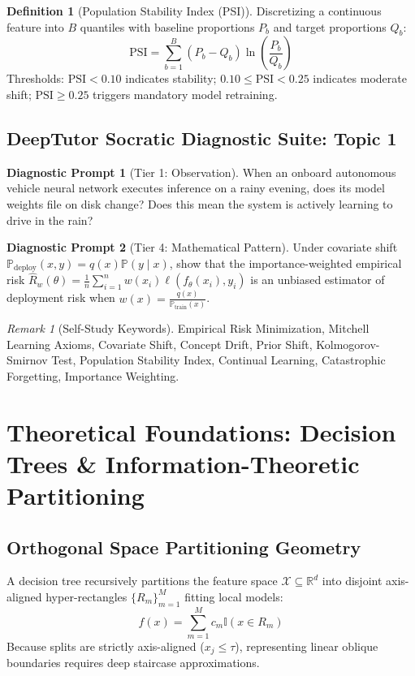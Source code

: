 \documentclass[11pt,a4paper]{article}
\theoremstyle{definition}
\newtheorem{definition}{Definition}[section]
\newtheorem{prompt}{Diagnostic Prompt}[section]
\theoremstyle{plain}
\theoremstyle{remark}
\newtheorem*{remark}{Remark}
\newcommand{\R}{\mathbb{R}}
\begin{document}
\begin{definition}[Population Stability Index (PSI)]
Discretizing a continuous feature into $B$ quantiles with baseline proportions $P_b$ and target proportions $Q_b$:
\begin{equation}
\mathrm{PSI} = \sum_{b=1}^B (P_b - Q_b) \ln\left( \frac{P_b}{Q_b} \right)
\end{equation}
Thresholds: $\mathrm{PSI} < 0.10$ indicates stability; $0.10 \le \mathrm{PSI} < 0.25$ indicates moderate shift; $\mathrm{PSI} \ge 0.25$ triggers mandatory model retraining.
\end{definition}

\subsection{DeepTutor Socratic Diagnostic Suite: Topic 1}
\begin{prompt}[Tier 1: Observation]
When an onboard autonomous vehicle neural network executes inference on a rainy evening, does its model weights file on disk change? Does this mean the system is actively learning to drive in the rain?
\end{prompt}
\begin{prompt}[Tier 4: Mathematical Pattern]
Under covariate shift $\mathbb{P}_{\mathrm{deploy}}(x, y) = q(x)\mathbb{P}(y \mid x)$, show that the importance-weighted empirical risk $\hat{R}_w(\theta) = \frac{1}{n}\sum_{i=1}^n w(x_i)\ell(f_\theta(x_i), y_i)$ is an unbiased estimator of deployment risk when $w(x) = \frac{q(x)}{\mathbb{P}_{\mathrm{train}}(x)}$.
\end{prompt}

\begin{remark}[Self-Study Keywords]
Empirical Risk Minimization, Mitchell Learning Axioms, Covariate Shift, Concept Drift, Prior Shift, Kolmogorov-Smirnov Test, Population Stability Index, Continual Learning, Catastrophic Forgetting, Importance Weighting.
\end{remark}

\section{Theoretical Foundations: Decision Trees \& Information-Theoretic Partitioning}

\subsection{Orthogonal Space Partitioning Geometry}
A decision tree recursively partitions the feature space $\mathcal{X} \subseteq \R^d$ into disjoint axis-aligned hyper-rectangles $\{R_m\}_{m=1}^M$ fitting local models:
\begin{equation}
f(x) = \sum_{m=1}^M c_m \mathbb{I}(x \in R_m)
\end{equation}
Because splits are strictly axis-aligned ($x_j \le \tau$), representing linear oblique boundaries requires deep staircase approximations.
\end{document}
